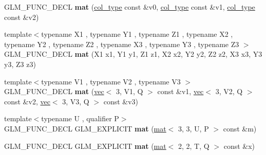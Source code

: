 \begin{DoxyCompactItemize}
\item 
\mbox{\label{structglm_1_1mat_3_013_00_013_00_01T_00_01Q_01_4_a5b6118e783938014443500ddd3b52416}} 
G\+L\+M\+\_\+\+F\+U\+N\+C\+\_\+\+D\+E\+CL {\bfseries mat} (\hyperlink{structglm_1_1vec_3_013_00_01T_00_01Q_01_4}{col\+\_\+type} const \&v0, \hyperlink{structglm_1_1vec_3_013_00_01T_00_01Q_01_4}{col\+\_\+type} const \&v1, \hyperlink{structglm_1_1vec_3_013_00_01T_00_01Q_01_4}{col\+\_\+type} const \&v2)
\item 
\mbox{\label{structglm_1_1mat_3_013_00_013_00_01T_00_01Q_01_4_a1958d5d2d97ed57c901037346514195b}} 
{\footnotesize template$<$typename X1 , typename Y1 , typename Z1 , typename X2 , typename Y2 , typename Z2 , typename X3 , typename Y3 , typename Z3 $>$ }\\G\+L\+M\+\_\+\+F\+U\+N\+C\+\_\+\+D\+E\+CL {\bfseries mat} (X1 x1, Y1 y1, Z1 z1, X2 x2, Y2 y2, Z2 z2, X3 x3, Y3 y3, Z3 z3)
\item 
\mbox{\label{structglm_1_1mat_3_013_00_013_00_01T_00_01Q_01_4_acc5615ebc8554446edf529b5ee5b14f3}} 
{\footnotesize template$<$typename V1 , typename V2 , typename V3 $>$ }\\G\+L\+M\+\_\+\+F\+U\+N\+C\+\_\+\+D\+E\+CL {\bfseries mat} (\hyperlink{structglm_1_1vec}{vec}$<$ 3, V1, Q $>$ const \&v1, \hyperlink{structglm_1_1vec}{vec}$<$ 3, V2, Q $>$ const \&v2, \hyperlink{structglm_1_1vec}{vec}$<$ 3, V3, Q $>$ const \&v3)
\item 
\mbox{\label{structglm_1_1mat_3_013_00_013_00_01T_00_01Q_01_4_a93aa9146893383e3c8038ccd483583a5}} 
{\footnotesize template$<$typename U , qualifier P$>$ }\\G\+L\+M\+\_\+\+F\+U\+N\+C\+\_\+\+D\+E\+CL G\+L\+M\+\_\+\+E\+X\+P\+L\+I\+C\+IT {\bfseries mat} (\hyperlink{structglm_1_1mat}{mat}$<$ 3, 3, U, P $>$ const \&m)
\item 
\mbox{\label{structglm_1_1mat_3_013_00_013_00_01T_00_01Q_01_4_a26c4cdf552e2ccbde34f4739a10334cd}} 
G\+L\+M\+\_\+\+F\+U\+N\+C\+\_\+\+D\+E\+CL G\+L\+M\+\_\+\+E\+X\+P\+L\+I\+C\+IT {\bfseries mat} (\hyperlink{structglm_1_1mat}{mat}$<$ 2, 2, T, Q $>$ const \&x)

\end{DoxyCompactItemize}
